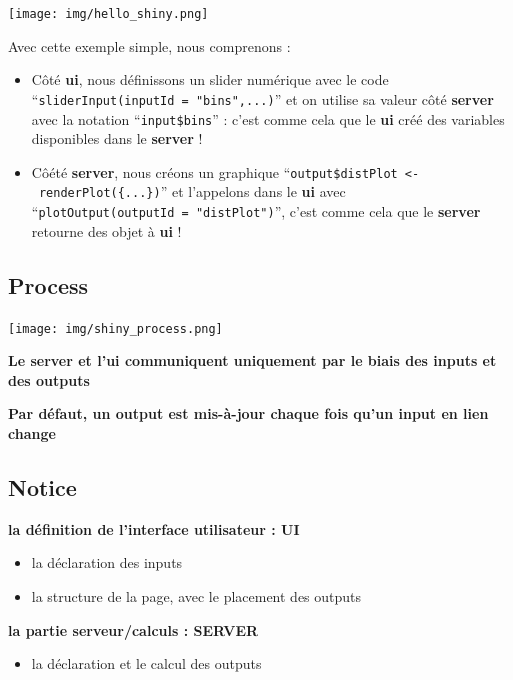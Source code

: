 \documentclass[
]{article}
\providecommand{\tightlist}{%
  \setlength{\itemsep}{0pt}\setlength{\parskip}{0pt}}
\begin{document}
\texttt{[image: img/hello\_shiny.png]}

Avec cette exemple simple, nous comprenons :

\begin{itemize}
\item
  Côté \textbf{ui}, nous définissons un slider numérique avec le code
  ``\texttt{sliderInput(inputId\ =\ "bins",...)}'' et on utilise sa
  valeur côté \textbf{server} avec la notation ``\texttt{input\$bins}''
  : c'est comme cela que le \textbf{ui} créé des variables disponibles
  dans le \textbf{server} !
\item
  Côété \textbf{server}, nous créons un graphique
  ``\texttt{output\$distPlot\ \textless{}-\ renderPlot(\{...\})}'' et
  l'appelons dans le \textbf{ui} avec
  ``\texttt{plotOutput(outputId\ =\ "distPlot")}'', c'est comme cela que
  le \textbf{server} retourne des objet à \textbf{ui} !
\end{itemize}

\hypertarget{process}{%
\subsection{Process}\label{process}}

\texttt{[image: img/shiny\_process.png]}

\textbf{Le server et l'ui communiquent uniquement par le biais des
inputs et des outputs}

\textbf{Par défaut, un output est mis-à-jour chaque fois qu'un input en
lien change}

\hypertarget{notice}{%
\subsection{Notice}\label{notice}}

\textbf{la définition de l'interface utilisateur : UI}

\begin{itemize}
\tightlist
\item
  la déclaration des inputs
\item
  la structure de la page, avec le placement des outputs
\end{itemize}

\textbf{la partie serveur/calculs : SERVER}

\begin{itemize}
\tightlist
\item
  la déclaration et le calcul des outputs
\end{itemize}
\end{document}
